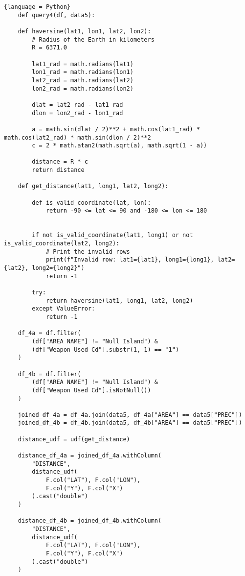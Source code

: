 \documentclass{article}
\begin{document}
\begin{lstlisting}{language = Python}
    def query4(df, data5):

    def haversine(lat1, lon1, lat2, lon2):
        # Radius of the Earth in kilometers
        R = 6371.0

        lat1_rad = math.radians(lat1)
        lon1_rad = math.radians(lon1)
        lat2_rad = math.radians(lat2)
        lon2_rad = math.radians(lon2)

        dlat = lat2_rad - lat1_rad
        dlon = lon2_rad - lon1_rad

        a = math.sin(dlat / 2)**2 + math.cos(lat1_rad) * math.cos(lat2_rad) * math.sin(dlon / 2)**2
        c = 2 * math.atan2(math.sqrt(a), math.sqrt(1 - a))

        distance = R * c
        return distance

    def get_distance(lat1, long1, lat2, long2):

        def is_valid_coordinate(lat, lon):
            return -90 <= lat <= 90 and -180 <= lon <= 180


        if not is_valid_coordinate(lat1, long1) or not is_valid_coordinate(lat2, long2):
            # Print the invalid rows
            print(f"Invalid row: lat1={lat1}, long1={long1}, lat2={lat2}, long2={long2}")
            return -1

        try:
            return haversine(lat1, long1, lat2, long2)
        except ValueError:
            return -1

    df_4a = df.filter(
        (df["AREA NAME"] != "Null Island") &
        (df["Weapon Used Cd"].substr(1, 1) == "1")
    )

    df_4b = df.filter(
        (df["AREA NAME"] != "Null Island") &
        (df["Weapon Used Cd"].isNotNull())
    )

    joined_df_4a = df_4a.join(data5, df_4a["AREA"] == data5["PREC"])
    joined_df_4b = df_4b.join(data5, df_4b["AREA"] == data5["PREC"])

    distance_udf = udf(get_distance)

    distance_df_4a = joined_df_4a.withColumn(
        "DISTANCE",
        distance_udf(
            F.col("LAT"), F.col("LON"),
            F.col("Y"), F.col("X")
        ).cast("double")
    )

    distance_df_4b = joined_df_4b.withColumn(
        "DISTANCE",
        distance_udf(
            F.col("LAT"), F.col("LON"),
            F.col("Y"), F.col("X")
        ).cast("double")
    )


\end{lstlisting}
\end{document}
